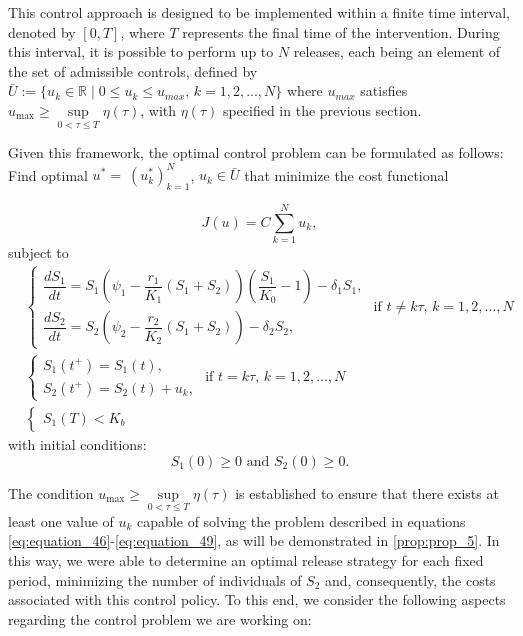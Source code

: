 \documentclass[10pt,letterpaper]{article}
\begin{document}
This control approach is designed to be implemented within a finite time interval, denoted by $[0, T]$, where $T$ represents the final time of the intervention. During this interval, it is possible to perform up to $N$ releases, each being an element of the set of admissible controls, defined by $\bar{U}:=\{u_k \in \mathbb{R} \mid 0 \leq u_k \leq u_{max}, \, k = 1,2,..., N\}$ where $u_{max}$ satisfies $u_{\text{max}} \geq \sup\limits_{0 < \tau \leq T} \eta(\tau)$, with $\eta(\tau)$ specified in the previous section.

Given this framework, the optimal control problem can be formulated as follows: Find optimal $u^* = \displaystyle \ (u^*_{k})_{k=1}^{N}$, $u_k \in \bar{U}$ that minimize the cost functional 
\begin{small}
\begin{equation}\label{eq:equation_46}
     J(u) = C \sum_{k=1}^{N} u_k,
\end{equation}subject to
\begin{align}
&\left.
\begin{cases}\label{eq:equation_47}
        \dfrac{dS_1}{dt}=S_1\left(\psi_1-\dfrac{r_1}{K_1}(S_1+S_2)\right)\left(\dfrac{S_1}{K_0} - 1 \right) - \delta_1 S_1,\\
        \dfrac{dS_2}{dt}=S_2\left(\psi_2-\dfrac{r_2}{K_2}(S_1+S_2)\right)-\delta_2S_2,
\end{cases}
\right.\text{ if } t \neq k\tau,\, k = 1, 2,...,N\\
&\left.
\begin{cases}\label{eq:equation_48}  
        S_1(t^+)= S_1(t), \\
        S_2(t^+)= S_2(t) + u_k,  
\end{cases}
\right.\text{ if } t = k\tau,\, k = 1, 2,...,N\\
&\left.\begin{cases}\label{eq:equation_49}
    S_1(T) < K_b
\end{cases}\right.
\end{align}
with initial conditions:
\begin{equation}\label{eq:equation_50}
    S_1(0) \geq 0 \mbox{ and } S_2(0) \geq 0.
\end{equation}
\end{small}

The condition \( u_{\text{max}} \geq \sup\limits_{0 < \tau \leq T} \eta(\tau) \) is established to ensure that there exists at least one value of \( u_k \) capable of solving the problem described in equations \eqref{eq:equation_46}-\eqref{eq:equation_49}, as will be demonstrated in \eqref{prop:prop_5}. In this way, we were able to determine an optimal release strategy for each fixed period, minimizing the number of individuals of $S_2$ and, consequently, the costs associated with this control policy. To this end, we consider the following aspects regarding the control problem we are working on:
\end{document}
